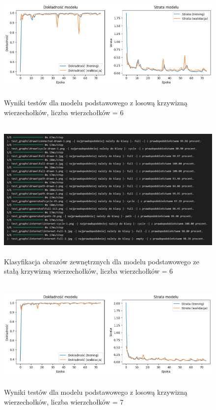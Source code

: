 \begin{figure}[ht]
	\centering
	\includegraphics[height=5.5cm]{resources/tests/images/v3/base6_img.png}
	\caption{Wyniki testów dla modelu podstawowego z losową krzywizną wierzechołków, liczba wierzchołków = 6}
	\label{Fig:tests-base-1}
\end{figure}
\FloatBarrier

\begin{figure}[ht]
	\centering
	\includegraphics[height=7cm]{resources/tests/images/v3/base6_txt.png}
	\caption{Klasyfikacja obrazów zewnętrznych dla modelu podstawowego ze stałą krzywizną wierzechołków, liczba wierzchołków = 6}
	\label{Fig:tests-base-2}
\end{figure}
\FloatBarrier

\begin{figure}[ht]
	\centering
	\includegraphics[height=5.5cm]{resources/tests/images/v3/base7_img.png}
	\caption{Wyniki testów dla modelu podstawowego z losową krzywizną wierzechołków, liczba wierzchołków = 7}
	\label{Fig:tests-base-1}
\end{figure}
\FloatBarrier

